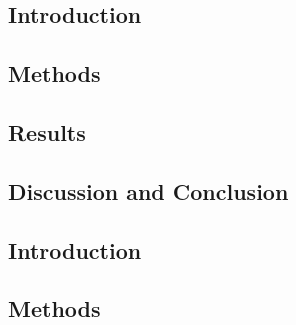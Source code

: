     
        
        
        \subsection{Introduction} \label{sec:extension_of_static_pca_based_data_driven_surrogate_signal_extraction_to_dynamic_pet_introduction}
        
        \subsection{Methods} \label{sec:extension_of_static_pca_based_data_driven_surrogate_signal_extraction_to_dynamic_pet_methods}
            
            
        \subsection{Results} \label{sec:extension_of_static_pca_based_data_driven_surrogate_signal_extraction_to_dynamic_pet_results}
            
            
        \subsection{Discussion and Conclusion} \label{sec:extension_of_static_pca_based_data_driven_surrogate_signal_extraction_to_dynamic_pet_discussion_and_conclusion}
            
    
        
        
        \subsection{Introduction} \label{sec:feasibility_of_neural_network_based_data_driven_surrogate_signal_extraction_methods_for_dynamic_pet_introduction}
        
        \subsection{Methods} \label{sec:feasibility_of_neural_network_based_data_driven_surrogate_signal_extraction_methods_for_dynamic_pet_methods}
            
